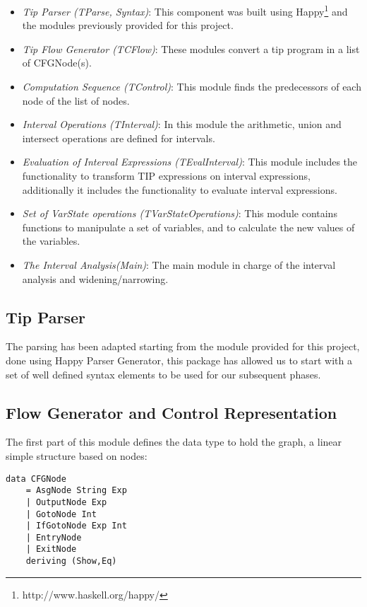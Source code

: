 \documentclass{article}
\begin{document}
\begin{itemize}
  \item \emph{Tip Parser (TParse, Syntax)}: This component was built using Happy\footnote{http://www.haskell.org/happy/} and the modules previously provided for this project.
  \item \emph{Tip Flow Generator (TCFlow)}: These modules convert a tip program in a list of CFGNode(s).
  \item \emph{Computation Sequence (TControl)}: This module finds the predecessors of each node of the list of nodes. 
  \item \emph{Interval Operations (TInterval)}: In this module the arithmetic, union and intersect operations are defined for intervals. 

  \item \emph{Evaluation of Interval Expressions (TEvalInterval)}: This module includes the functionality to transform TIP expressions on interval expressions, additionally it includes the functionality to evaluate interval expressions.
  \item \emph{Set of VarState operations (TVarStateOperations)}: This module contains functions to manipulate a set of variables, and to calculate the new values of the variables.
  \item \emph{The Interval Analysis(Main)}: The main module in charge of the interval analysis and widening/narrowing.

\end{itemize}

\subsection{Tip Parser}

The parsing has been adapted starting from the module provided for this project, done using Happy Parser Generator, this package has allowed us to start with a set of well defined syntax elements to be used for our subsequent phases.


\subsection{Flow Generator and Control Representation}
The first part of this module defines the data type to hold the graph, a linear simple structure based on nodes:

\begin{verbatim}
data CFGNode
    = AsgNode String Exp 
    | OutputNode Exp
    | GotoNode Int
    | IfGotoNode Exp Int 
    | EntryNode
    | ExitNode
    deriving (Show,Eq)

\end{verbatim}
\end{document}
